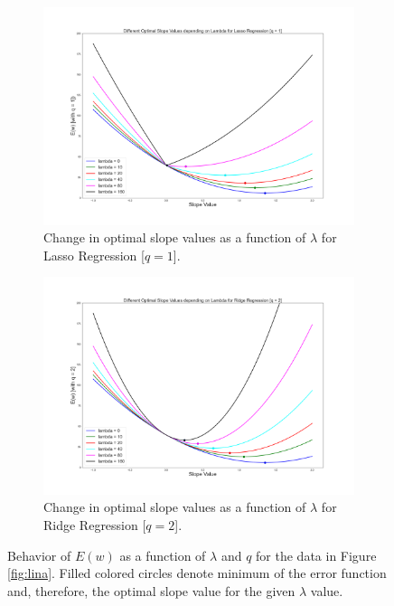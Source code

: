 \documentclass[11pt, a4paper]{article}
\begin{document}
\begin{figure}[htb!]
	\centering
    \begin{subfigure}[b]{0.8\linewidth}
        \includegraphics[width=\linewidth]{lasso.png}
        \caption{Change in optimal slope values as a function of $\lambda$ for Lasso Regression [$q = 1$].}
        \label{fig:lasso}
    \end{subfigure}
    \begin{subfigure}[b]{0.8\linewidth}
        \includegraphics[width=\linewidth]{ridge.png}
        \caption{Change in optimal slope values as a function of $\lambda$ for Ridge Regression [$q = 2$].}
        \label{fig:ridge}
    \end{subfigure}
    \caption{Behavior of $E(w)$ as a function of $\lambda$ and $q$ for the data in Figure \ref{fig:lina}. Filled colored circles denote minimum of the error function and, therefore, the optimal slope value for the given $\lambda$ value.}
    \label{fig:lambda}
\end{figure}
\end{document}
